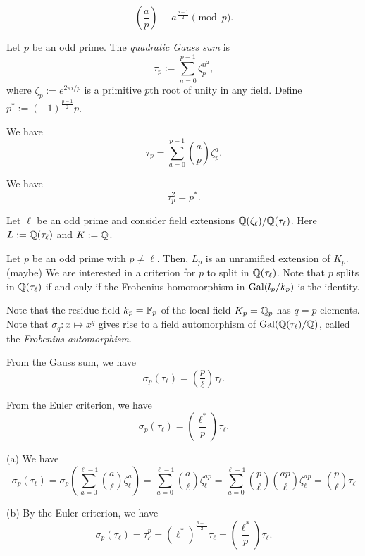 \documentclass{../../large}
\begin{document}
\begin{prb}
\[\left(\frac ap\right)\equiv a^{\frac{p-1}2}\pmod p.\]
\end{prb}

\begin{prb}
Let $p$ be an odd prime.
The \emph{quadratic Gauss sum} is
\[\tau_p:=\sum_{n=0}^{p-1}\zeta_p^{n^2},\]
where $\zeta_p:=e^{2\pi i/p}$ is a primitive $p$th root of unity in any field.
Define $p^*:=(-1)^{\frac{p-1}2}p$.
\begin{parts}
\item We have
\[\tau_p=\sum_{a=0}^{p-1}\left(\frac ap\right)\zeta_p^a.\]
\item We have
\[\tau_p^2=p^*.\]
\end{parts}
\end{prb}

\begin{prb}
Let $\ell$ be an odd prime and consider field extensions $\mathbb{Q}(\zeta_\ell)/\mathbb{Q}(\tau_\ell)$.
Here $L:=\mathbb{Q}(\tau_\ell)$ and $K:=\mathbb{Q}$.

Let $p$ be an odd prime with $p\ne\ell$.
Then, $L_p$ is an unramified extension of $K_p$.(maybe)
We are interested in a criterion for $p$ to split in $\mathbb{Q}(\tau_\ell)$.
Note that $p$ splits in $\mathbb{Q}(\tau_\ell)$ if and only if the Frobenius homomorphism in $\operatorname{Gal}(l_p/k_p)$ is the identity.

Note that the residue field $k_p=\mathbb{F}_p$ of the local field $K_p=\mathbb{Q}_p$ has $q=p$ elements.
Note that $\sigma_q:x\mapsto x^q$ gives rise to a field automorphism of $\operatorname{Gal}(\mathbb{Q}(\tau_\ell)/\mathbb{Q})$, called the \emph{Frobenius automorphism}.
\begin{parts}
\item From the Gauss sum, we have
\[\sigma_p(\tau_\ell)=\left(\frac p\ell\right)\tau_\ell.\]
\item From the Euler criterion, we have
\[\sigma_p(\tau_\ell)=\left(\frac{\ell^*}p\right)\tau_\ell.\]
\end{parts}
\end{prb}
\begin{pf}
(a)
We have
\[\sigma_p(\tau_\ell)
=\sigma_p\left(\sum_{a=0}^{\ell-1}\left(\frac a\ell\right)\zeta_\ell^a\right)
=\sum_{a=0}^{\ell-1}\left(\frac a\ell\right)\zeta_\ell^{ap}
=\sum_{a=0}^{\ell-1}\left(\frac p\ell\right)\left(\frac{ap}\ell\right)\zeta_\ell^{ap}
=\left(\frac p\ell\right)\tau_\ell\]

(b)
By the Euler criterion, we have
\[\sigma_p(\tau_\ell)=\tau_\ell^p=(\ell^*)^{\frac{p-1}2}\tau_\ell=\left(\frac{\ell^*}p\right)\tau_\ell.\]

\end{pf}
\end{document}
